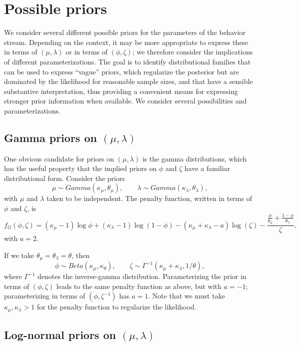 \documentclass[11pt]{article}\usepackage[]{graphicx}\usepackage[]{color}
\begin{document}
\section{Possible priors}

We consider several different possible priors for the parameters of the behavior stream. Depending on the context, it may be more appropriate to express these in terms of $(\mu, \lambda)$ or in terms of $(\phi, \zeta)$; we therefore consider the implications of different parameterizations. The goal is to identify distributional families that can be used to express ``vague'' priors, which regularize the posterior but are dominated by the likelihood for reasonable sample sizes, and that have a sensible substantive interpretation, thus providing a convenient means for expressing stronger prior information when available. We consider several possibilities and parameterizations.

\subsection{Gamma priors on $(\mu, \lambda)$}

One obvious candidate for priors on $(\mu, \lambda)$ is the gamma distributions, which has the useful property that the implied priors on $\phi$ and $\zeta$ have a familiar distributional form. Consider the priors \[
\mu \sim Gamma\left(\kappa_\mu, \theta_\mu\right), \qquad \lambda \sim Gamma\left(\kappa_\lambda, \theta_\lambda\right), \]
with $\mu$ and $\lambda$ taken to be independent. The penalty function, written in terms of $\phi$ and $\zeta$, is \[
f_{G}\left(\phi, \zeta\right) = \left(\kappa_\mu - 1\right) \log \phi + \left(\kappa_\lambda - 1\right) \log(1 - \phi) - \left(\kappa_\mu + \kappa_\lambda - a\right) \log(\zeta) - \frac{\frac{\phi}{\theta_\mu} + \frac{1 - \phi}{\theta_\lambda}}{\zeta}, \]
with $a = 2$. 

If we take $\theta_\mu = \theta_\lambda = \theta$, then \[
\phi \sim Beta\left(\kappa_\mu, \kappa_\theta\right), \qquad \zeta \sim \Gamma^{-1}\left(\kappa_\mu + \kappa_\lambda, 1 / \theta\right), \]
where $\Gamma^{-1}$ denotes the inverse-gamma distribution. Parameterizing the prior in terms of $\left(\phi, \zeta\right)$ leads to the same penalty function as above, but with $a = -1$; parameterizing in terms of $\left(\phi, \zeta^{-1}\right)$ has $a = 1$. Note that we must take $\kappa_\mu, \kappa_\lambda > 1$ for the penalty function to regularize the likelihood.

\subsection{Log-normal priors on $(\mu, \lambda)$}
\end{document}
